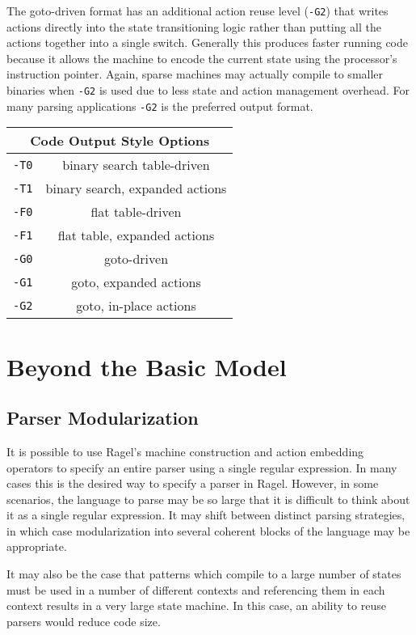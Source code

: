 \documentclass[letterpaper,11pt,oneside]{book}
\newcommand{\verbspace}{\vspace{10pt}}
\begin{document}
The goto-driven format has an additional action reuse level (\verb|-G2|) that
writes actions directly into the state transitioning logic rather than putting
all the actions together into a single switch. Generally this produces faster
running code because it allows the machine to encode the current state using
the processor's instruction pointer. Again, sparse machines may actually
compile to smaller binaries when \verb|-G2| is used due to less state and
action management overhead. For many parsing applications \verb|-G2| is the
preferred output format.

\verbspace
\begin{center}
\begin{tabular}{|c|c|}
\hline
\multicolumn{2}{|c|}{\bf Code Output Style Options} \\
\hline
\verb|-T0|&binary search table-driven\\
\hline
\verb|-T1|&binary search, expanded actions\\
\hline
\verb|-F0|&flat table-driven\\
\hline
\verb|-F1|&flat table, expanded actions\\
\hline
\verb|-G0|&goto-driven\\
\hline
\verb|-G1|&goto, expanded actions\\
\hline
\verb|-G2|&goto, in-place actions\\
\hline
\end{tabular}
\end{center}

\chapter{Beyond the Basic Model}

\section{Parser Modularization}

It is possible to use Ragel's machine construction and action embedding
operators to specify an entire parser using a single regular expression. In
many cases this is the desired way to specify a parser in Ragel. However, in
some scenarios, the language to parse may be so large that it is difficult to
think about it as a single regular expression. It may shift between distinct
parsing strategies, in which case modularization into several coherent blocks
of the language may be appropriate.

It may also be the case that patterns which compile to a large number of states
must be used in a number of different contexts and referencing them in each
context results in a very large state machine. In this case, an ability to reuse
parsers would reduce code size.
\end{document}
